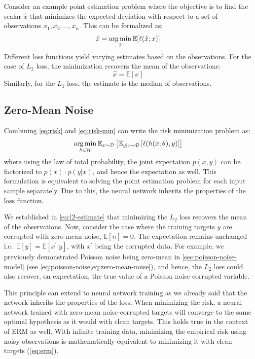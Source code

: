 Consider an example point estimation problem where the objective is to find the scalar $\hat{x}$ that minimizes the expected deviation with respect to a set of observations $x_1, x_2, \dots, x_n$. This can be formalized as:
\begin{equation}
    \hat{x} = \operatorname*{arg\,min}_{\hat{x}} \mathbb{E}[\ell(\hat{x}; x)]
\end{equation}
Different loss functions yield varying estimates based on the observations. For the case of $L_2$ loss, the minimization recovers the mean of the observations:
\begin{equation}\label{eq:l2-estimate}
    \hat{x} = \mathbb{E}[x]
\end{equation}
Similarly, for the $L_1$ loss, the estimate is the median of observations.

\subsection{Zero-Mean Noise}
Combining \cref{eq:risk} and \cref{eq:risk-min} can write the risk minimization problem as:
\begin{equation}
    \operatorname*{arg\,min}_{h \in \mathcal{H}} \mathbb{E}_{x \sim \mathcal{D}} \left[\mathbb{E}_{y|x \sim \mathcal{D}} \left[ \ell(h(x; \theta), y) \right]\right]
\end{equation}
where using the law of total probability, the joint expectation $p(x,y)$ can be factorized to $p(x) \cdot p(y | x)$, and hence the expectation as well. This formulation is equivalent to solving the point estimation problem for each input sample separately. Due to this, the neural network inherits the properties of the loss function.

We established in \cref{eq:l2-estimate} that minimizing the $L_2$ loss recovers the mean of the observations. Now, consider the case where the training targets $y$ are corrupted with zero-mean noise, $\mathbb{E}[n] = 0$. The expectation remains unchanged i.e.\ $\mathbb{E}[y] = \mathbb{E}[x^\prime|y]$, with $x^\prime$ being the corrupted data. For example, we previously demonstrated Poisson noise being zero-mean  in \cref{sec:poisson-noise-model} (see \cref{eq:poisson-noise,eq:zero-mean-noise}), and hence, the $L_2$ loss could also recover, on expectation, the true value of a Poisson noise corrupted variable.

This principle can extend to neural network training as we already said that the network inherits the properties of the loss. When minimizing the risk, a neural network trained with zero-mean noise-corrupted targets will converge to the same optimal hypothesis as it would with clean targets. This holds true in the context of \gls{ERM} as well. With infinite training data, minimizing the empirical risk using noisy observations is mathematically equivalent to minimizing it with clean targets (\cref{eq:erm}).

